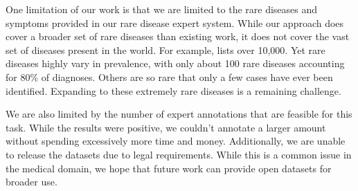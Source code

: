 
One limitation of our work is that we are limited to the rare diseases and symptoms provided in our rare disease expert system.  While our approach does cover a broader set of rare diseases than existing work, it does not cover the vast set of diseases present in the world. For example, \cite{rare_disease_mass_list} lists over 10,000.  Yet rare diseases highly vary in prevalence, with only about 100 rare diseases accounting for 80\% of diagnoses\cite{evansRareGeneral}.  Others are so rare that only a few cases have ever been identified. Expanding to these extremely rare diseases is a remaining challenge. 

We are also limited by the number of expert annotations that are feasible for this task.  While the results were positive, we couldn't annotate a larger amount without spending excessively more time and money. Additionally, we are unable to release the datasets due to legal requirements.  While this is a common issue in the medical domain, we hope that future work can provide open datasets for broader use.

